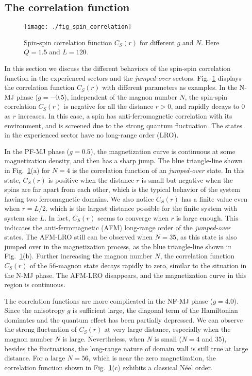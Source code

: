 \documentclass[article,10pt,onecolumn,superscriptaddress,floatfix]{revtex4}
\begin{document}
\subsection{The correlation function}
\begin{flushleft}
	\begin{figure}[!tb] %
		\centering
		\texttt{[image: ./fig\_spin\_correlation]}
		\caption{ Spin-spin correlation function $C_{S}(r)$ for different $g$ and $N$. Here $Q=1.5$ and $L=120$. }
		\label{fig:correlation_1}
	\end{figure}
\end{flushleft}
In this section we discuss the different behaviors of the spin-spin correlation function
in the experienced sectors and the \textit{jumped-over} sectors. Fig.~\ref{fig:correlation_1} displays the correlation function $C_{S}(r)$ with different parameters as examples. In the N-MJ phase ($g=-0.5$), independent of the magnon number $N$, the spin-spin correlation $C_S(r)$ is negative for all the distance $r>0$, and rapidly decays to $0$ as $r$ increases. In this case, a spin has anti-ferromagnetic correlation with its environment, and is screened due to the strong quantum fluctuation. The states in the experienced sector have no long-range order (LRO).



In the PF-MJ phase ($g=0.5$), the magnetization curve is continuous at some magnetization density, and then has a sharp jump. The blue triangle-line shown in Fig.~\ref{fig:correlation_1}(a) for $N=4$ is the correlation function of an \textit{jumped-over} state. In this state, $C_{S}(r)$ is positive when the distance $r$ is small but negative when the spins are far apart from each other, which is the typical behavior of the system having two ferromagnetic domains. We also notice $C_{S}(r)$ has a finite value even when $r=L/2$, which is the largest distance possible for the finite system with system size $L$. In fact, $C_{S}(r)$ seems to converge when $r$ is large enough. This indicates the anti-ferromagnetic (AFM) long-range order of the \textit{jumped-over} states. The AFM-LRO still can be observed when $N=35$, as this state is also jumped over in the magnetization process, as the blue triangle-line shown in Fig.~\ref{fig:correlation_1}(b). Further increasing the magnon number $N$, the correlation function $C_{S}(r)$ of the $56$-magnon state decays rapidly to zero, similar to the situation in the N-MJ phase. The AFM-LRO disappears, and the magnetization curve in this region is continuous.



The correlation functions are more complicated in the NF-MJ phase ($g=4.0$). Since the anisotropy $g$ is sufficient large, the diagonal term of the Hamiltonian dominates and the quantum effect has been partially depressed. We can observe the strong fluctuation of $C_S(r)$ at very large distance, especially when the magnon number $N$ is large. Nevertheless, when $N$ is small ($N=4$ and $35$), besides the fluctuations, the long-range nature of domain wall is still true at large distance. For a large $N=56$, which is near the zero magnetization, the correlation function shown in Fig.~\ref{fig:correlation_1}(c) exhibits a classical N\'eel order.
\end{document}
